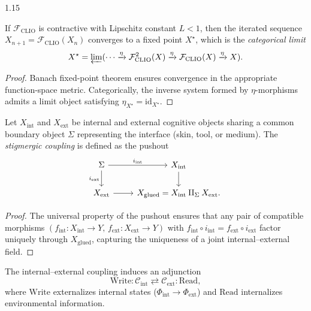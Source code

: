 \documentclass[12pt,a4paper]{article}
\begin{document}
\begin{spacing}{1.15}
\begin{proposition}
\label{prop:clio-limit}
If \(\mathcal{F}_{\mathrm{CLIO}}\) is contractive with Lipschitz constant \(L<1\),
then the iterated sequence
\(X_{n+1}=\mathcal{F}_{\mathrm{CLIO}}(X_n)\)
converges to a fixed point
\(X^\star\),
which is the \emph{categorical limit}
\[
  X^\star = \varprojlim (\cdots \xrightarrow{\eta} \mathcal{F}^2_{\mathrm{CLIO}}(X)
  \xrightarrow{\eta} \mathcal{F}_{\mathrm{CLIO}}(X)
  \xrightarrow{\eta} X).
\]
\end{proposition}

\begin{proof}
Banach fixed-point theorem ensures convergence in the appropriate function-space metric.
Categorically, the inverse system formed by \(\eta\)-morphisms admits a limit object satisfying
\(\eta_{X^\star}=\mathrm{id}_{X^\star}\).
\end{proof}

\begin{definition}
\label{def:pushout}
Let \(X_{\mathrm{int}}\) and \(X_{\mathrm{ext}}\)
be internal and external cognitive objects
sharing a common boundary object \(\Sigma\)
representing the interface (skin, tool, or medium).
The \emph{stigmergic coupling} is defined as the pushout
\[
\begin{tikzcd}
\Sigma \arrow[r, "i_{\mathrm{int}}"] \arrow[d, "i_{\mathrm{ext}}"'] &
  X_{\mathrm{int}} \arrow[d] \\
X_{\mathrm{ext}} \arrow[r] &
  X_{\mathrm{glued}} = X_{\mathrm{int}} \amalg_{\Sigma} X_{\mathrm{ext}} .
\end{tikzcd}
\]
\]
\end{definition}

\begin{proof}
The universal property of the pushout ensures that any pair of compatible morphisms
\((f_{\mathrm{int}}:X_{\mathrm{int}}\to Y,\,
  f_{\mathrm{ext}}:X_{\mathrm{ext}}\to Y)\)
with \(f_{\mathrm{int}}\circ i_{\mathrm{int}}=f_{\mathrm{ext}}\circ i_{\mathrm{ext}}\)
factor uniquely through \(X_{\mathrm{glued}}\),
capturing the uniqueness of a joint internal–external field.
\end{proof}

\begin{theorem}
\label{thm:adjunction}
The internal–external coupling induces an adjunction
\[
\mathrm{Write} : \mathcal{C}_{\mathrm{int}}
  \rightleftarrows
  \mathcal{C}_{\mathrm{ext}} : \mathrm{Read},
\]
where
\(\mathrm{Write}\) externalizes internal states
(\(\Phi_{\mathrm{int}}\to\Phi_{\mathrm{ext}}\))
and
\(\mathrm{Read}\) internalizes environmental information.
\end{theorem}


\end{spacing}
\end{document}
